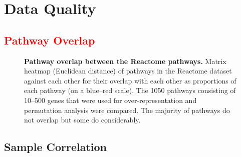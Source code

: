 



\chapter{Data Quality}
\label{appendix:sample_checking}

\section{\textcolor{red}{Pathway Overlap}}
\label{appendix:pathway_overlap}

\begin{figure}[!ht]
  \begin{center}
   \end{center}
   \caption[Pathway overlap between the Reactome pathways]{\small \textbf{Pathway overlap between the Reactome pathways.} Matrix heatmap (Euclidean distance) of pathways in the Reactome dataset against each other for their overlap with each other as proportions of each pathway (on a blue--red scale). The 1050 pathways consisting of 10--500 genes that were used for over-representation and permutation analysis were compared. The majority of pathways do not overlap but some do considerably.}
\label{fig:pathway_overlap}
\end{figure}

\FloatBarrier

\section{Sample Correlation}
\label{appendix:sample_correlation}

